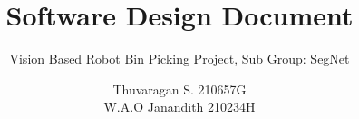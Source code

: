 \documentclass{template}
\begin{document}

\title{\huge{Software Design Document}}
\author{Thuvaragan S. 210657G \\ W.A.O Janandith 210234H}
\subtitle{Vision Based Robot Bin Picking Project, Sub Group: SegNet}
\beforeabstract
\tableofcontents
% 
\afterabstract









\footnotesize  %
\printbibliography
\normalsize
\appendix

\end{document}
